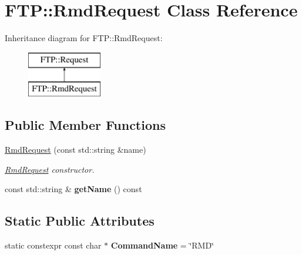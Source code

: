 \hypertarget{class_f_t_p_1_1_rmd_request}{\section{F\-T\-P\-:\-:Rmd\-Request Class Reference}
\label{class_f_t_p_1_1_rmd_request}
}
Inheritance diagram for F\-T\-P\-:\-:Rmd\-Request\-:\begin{figure}[H]
\begin{center}
\leavevmode
\includegraphics[height=2.000000cm]{class_f_t_p_1_1_rmd_request}
\end{center}
\end{figure}
\subsection*{Public Member Functions}
\begin{DoxyCompactItemize}
\item 
\hyperlink{class_f_t_p_1_1_rmd_request_a3448c5596eaa91cecc3f28ed11daff21}{Rmd\-Request} (const std\-::string \&name)
\begin{DoxyCompactList}\small\item\em \hyperlink{class_f_t_p_1_1_rmd_request}{Rmd\-Request} constructor. \end{DoxyCompactList}\item 
\hypertarget{class_f_t_p_1_1_rmd_request_a35c6a64e5187959710215f04598a6320}{const std\-::string \& {\bfseries get\-Name} () const }\label{class_f_t_p_1_1_rmd_request_a35c6a64e5187959710215f04598a6320}

\end{DoxyCompactItemize}
\subsection*{Static Public Attributes}
\begin{DoxyCompactItemize}
\item 
\hypertarget{class_f_t_p_1_1_rmd_request_ae3771e8e3f539659d04cd4219ad09930}{static constexpr const char $\ast$ {\bfseries Command\-Name} = \char`\"{}R\-M\-D\char`\"{}}\label{class_f_t_p_1_1_rmd_request_ae3771e8e3f539659d04cd4219ad09930}

\end{DoxyCompactItemize}


